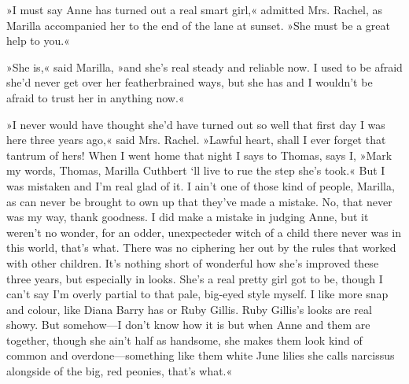 »I must say Anne has turned out a real smart girl,« admitted Mrs. Rachel, as Marilla accompanied her to the end of the lane at sunset. »She must be a great help to you.«

»She is,« said Marilla, »and she's real steady and reliable now. I used to be afraid she'd never get over her featherbrained ways, but she has and I wouldn't be afraid to trust her in anything now.«

»I never would have thought she'd have turned out so well that first day I was here three years ago,« said Mrs. Rachel. »Lawful heart, shall I ever forget that tantrum of hers! When I went home that night I says to Thomas, says I, »Mark my words, Thomas, Marilla Cuthbert `ll live to rue the step she's took.« But I was mistaken and I'm real glad of it. I ain't one of those kind of people, Marilla, as can never be brought to own up that they've made a mistake. No, that never was my way, thank goodness. I did make a mistake in judging Anne, but it weren't no wonder, for an odder, unexpecteder witch of a child there never was in this world, that's what. There was no ciphering her out by the rules that worked with other children. It's nothing short of wonderful how she's improved these three years, but especially in looks. She's a real pretty girl got to be, though I can't say I'm overly partial to that pale, big-eyed style myself. I like more snap and colour, like Diana Barry has or Ruby Gillis. Ruby Gillis's looks are real showy. But somehow—I don't know how it is but when Anne and them are together, though she ain't half as handsome, she makes them look kind of common and overdone—something like them white June lilies she calls narcissus alongside of the big, red peonies, that's what.«